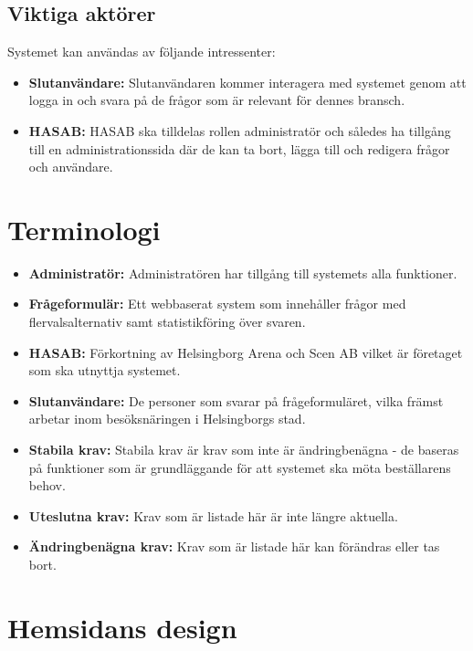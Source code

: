 \documentclass{article}
\begin{document}
    \subsection{Viktiga aktörer}
    Systemet kan användas av följande intressenter:
    \begin{itemize}
        \item \textbf{Slutanvändare:} Slutanvändaren kommer interagera med systemet genom att logga in och svara på de frågor som är relevant för dennes bransch.
        \item \textbf{HASAB:} HASAB ska tilldelas rollen administratör och således ha tillgång till en administrationssida där de kan ta bort, lägga till och redigera frågor och användare.
     \end{itemize}
    
    \section{Terminologi}
    \begin{itemize}
        \item \textbf{Administratör:} Administratören har tillgång till systemets alla funktioner.
         \item \textbf{Frågeformulär:} Ett webbaserat system som innehåller frågor med flervalsalternativ samt statistikföring över svaren.
        \item \textbf{HASAB:} Förkortning av Helsingborg Arena och Scen AB vilket är företaget som ska utnyttja systemet.
        \item \textbf{Slutanvändare:}  De personer som svarar på frågeformuläret, vilka främst arbetar inom besöksnäringen i Helsingborgs stad. 
        \item\textbf{Stabila krav:}  Stabila krav är krav som inte är ändringbenägna - de baseras på funktioner som är grundläggande för att systemet ska möta beställarens behov.
         \item \textbf{Uteslutna krav:}  Krav som är listade här är inte längre aktuella.
        \item \textbf{Ändringbenägna krav:}  Krav som är listade här kan förändras eller tas bort.
       
    \end{itemize}
    
    \section{Hemsidans design}
    
\end{document}
